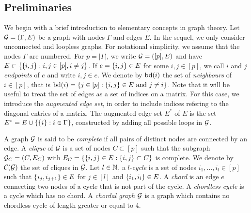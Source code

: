 \subsection{Preliminaries} \label{sec-prelim}

We begin with a brief introduction to elementary concepts in graph theory. Let ${\mathcal{G}} = (\Gamma, E)$ be a graph with nodes $\Gamma$ and edges $E$. In the sequel, we only consider unconnected and loopless graphs. For notational simplicity, we assume that the nodes $\Gamma$ are numbered. For $p = |\Gamma|$, we write ${\mathcal{G}} = ([p], E)$ and have $E \subset {\left\{ {\left\{i, j\right\}} : i, j \in [p], i \neq j \right\}}$. If $e = {\left\{i, j\right\}} \in E$ for some $i, j \in [p]$, we call $i$ and $j$ \textit{endpoints} of $e$ and write $i, j \in e$.  We denote by ${\textrm{bd}}(i)$ the set of \textit{neighbours} of $i \in [p]$, that is ${\textrm{bd}}(i) = {\left\{ j \in [p] : {\left\{i, j\right\}} \in E {\textrm{ and }} j \neq i\right\}}$.  Note that it will be useful to treat the set of edges as a set of indices on a matrix. For this case, we introduce the \textit{augmented edge set}, in order to include indices refering to the diagonal entries of a matrix. The augmented edge set $E^*$ of $E$ is the set $E^* = E \cup {\left\{ {\left\{i\right\}} : i \in \Gamma \right\}}$, constructed by adding all possible loops in ${\mathcal{G}}$.

A graph ${\mathcal{G}}$ is said to be \textit{complete} if all pairs of distinct nodes are connected by an edge. A \textit{clique} of ${\mathcal{G}}$ is a set of nodes $C \subset [p]$ such that the subgraph ${\mathcal{G}}_C = (C, E_C)$ with $E_C = {\left\{ {\left\{i, j\right\}} \in E : {\left\{i, j\right\}} \subset C \right\}}$ is complete. We denote by ${\mathcal{C}}({\mathcal{G}})$ the set of cliques in ${\mathcal{G}}$. Let $l \in \mathbb{N}$, a $l$-\textit{cycle} is a set of nodes $i_1, \ldots, i_l \in [p]$ such that ${\left\{i_j, i_{j+1}\right\}} \in E$ for $j \in [l]$ and ${\left\{i_1, i_l\right\}} \in E$. A \textit{chord} is an edge $e$ connecting two nodes of a cycle that is not part of the cycle. A \textit{chordless cycle} is a cycle which has no chord. A \textit{chordal graph} ${\mathcal{G}}$ is a graph which contains no chordless cycle of length greater or equal to 4.

